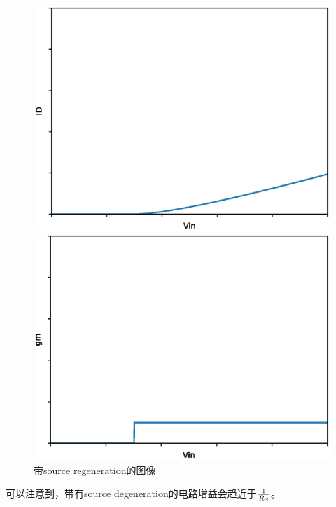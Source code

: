 \documentclass[twoside,a4paper,openright,titlepage,draft]{ctexrep}
\begin{document}
\begin{figure}[H]
    \centering
    \begin{minipage}{0.49\linewidth}
        \centering
        \includegraphics[width=\linewidth]{yesdegeneration1.eps}
    \end{minipage}
    \begin{minipage}{0.49\linewidth}
        \centering
        \includegraphics[width=\linewidth]{yesdegeneration2.eps}
    \end{minipage}
    \caption{带source regeneration的图像}
    \label{fig:带degeneration的图像}
\end{figure}

可以注意到，带有source degeneration的电路增益会趋近于$1 \over R_S$。
\end{document}
